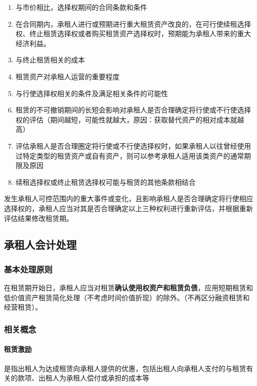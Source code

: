\documentclass[UTF8,12pt]{ctexart}
\numberwithin{equation}{section} %
\numberwithin{figure}{section}
\numberwithin{table}{section}
\begin{document}
	\begin{enumerate}
		\item 与市价相比，选择权期间的合同条款和条件
		
		\item 在合同期内，承租人进行或预期进行重大租赁资产改良的，在可行使续租选择权、终止租赁选择权或者购买租赁资产选择权时，预期能为承租人带来的重大经济利益。
		
		\item 与终止租赁相关的成本
		
		\item 租赁资产对承租人运营的重要程度
		
		\item 与行使选择权相关的条件及满足相关条件的可能性
		
		\item 租赁的不可撤销期间的长短会影响对承租人是否合理确定将行使或不行使选择权的评估（期间越短，可能性就越大，原因：获取替代资产的相对成本就越高）
		
		\item 评估承租人是否合理圈定将行使或不行使选择权时，如果承租人以往曾经使用过特定类型的租赁资产或自有资产，则可以参考承租人适用该类资产的通常期限及原因
		
		\item 续租选择权或终止租赁选择权可能与租赁的其他条款相结合
	\end{enumerate}
	
	发生承租人可控范围内的重大事件或变化，且影响承租人是否合理确定将行使相应选择权的，承租人应当对其是否合理确定以上三种权利进行重新评估，并根据重新评估结果修改租赁期。
	
	\subsection{承租人会计处理}
	\subsubsection{基本处理原则}
	在租赁期开始日，承租人应当对租赁\textbf{确认使用权资产和租赁负债}，应用短期租赁和低价值资产租赁简化处理（不考虑时间价值折现）的除外。（不再区分融资租赁和经营租赁）。
	
	\subsubsection{相关概念}
	\paragraph{租赁激励}是指出租人为达成租赁向承租人提供的优惠，包括出租人向承租人支付的与租赁有关的款项、出租人为承租人偿付或承担的成本等
	
\end{document}

